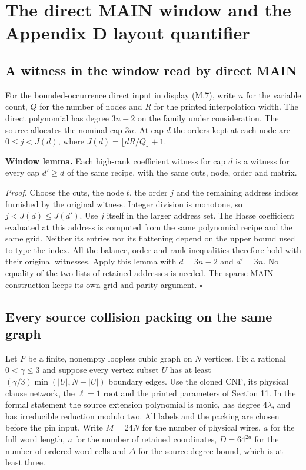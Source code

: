 \documentclass[
  11pt,
]{article}
\begin{document}
\section{The direct MAIN window and the Appendix D layout quantifier}
\label{sec:window-and-layout}

\subsection{A witness in the window read by direct MAIN}
For the bounded-occurrence direct input in display (M.7), write \(n\) for
the variable count, \(Q\) for the number of nodes and \(R\) for the
printed interpolation width. The direct polynomial has degree \(3n-2\)
on the family under consideration. The source allocates the nominal cap
\(3n\). At cap \(d\) the orders kept at each node are \(0\le j<J(d)\),
where \(J(d)=\lfloor dR/Q\rfloor+1\).

\textbf{Window lemma.} Each high-rank coefficient witness for cap \(d\)
is a witness for every cap \(d'\ge d\) of the same recipe, with the same
cuts, node, order and matrix.

\emph{Proof.} Choose the cuts, the node \(t\), the order \(j\) and the
remaining address indices furnished by the original witness. Integer
division is monotone, so \(j<J(d)\le J(d')\). Use \(j\) itself in the
larger address set. The Hasse coefficient evaluated at this address is
computed from the same polynomial recipe and the same grid. Neither
its entries nor its flattening depend on the upper bound used to type
the index. All the balance, order and rank inequalities therefore hold
with their original witnesses. Apply this lemma with \(d=3n-2\) and
\(d'=3n\). No equality of the two lists of retained addresses is needed.
The sparse MAIN construction keeps its own grid and parity argument.
\(\square\)

\subsection{Every source collision packing on the same graph}
Let \(F\) be a finite, nonempty loopless cubic graph on \(N\) vertices.
Fix a rational \(0<\gamma\le3\) and suppose every vertex subset \(U\)
has at least \((\gamma/3)\min(|U|,N-|U|)\) boundary edges. Use the
cloned CNF, its physical clause network, the \(\ell=1\) root and the
printed parameters of Section 11. In the formal statement the source
extension polynomial is monic, has degree \(4\lambda\), and has
irreducible reduction modulo two. All labels and the packing are chosen
before the pin input. Write \(M=24N\) for the number of physical wires,
\(a\) for the full word length, \(u\) for the number of retained
coordinates, \(D=64^{2a}\) for the number of ordered word cells and
\(\Delta\) for the source degree bound, which is at least three.
\end{document}

